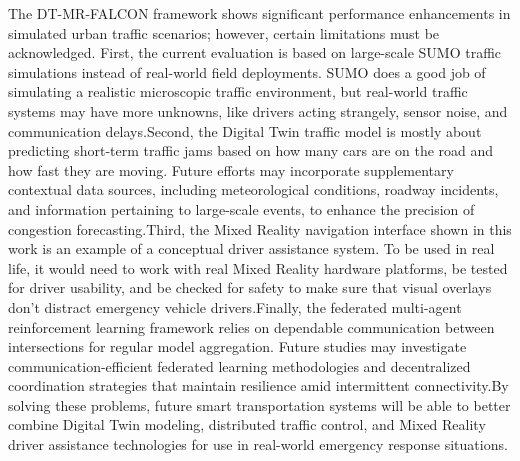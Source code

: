 \documentclass[conference]{IEEEtran}
\begin{document}
The DT-MR-FALCON framework shows significant performance enhancements in simulated urban traffic scenarios; however, certain limitations must be acknowledged. First, the current evaluation is based on large-scale SUMO traffic simulations instead of real-world field deployments. SUMO does a good job of simulating a realistic microscopic traffic environment, but real-world traffic systems may have more unknowns, like drivers acting strangely, sensor noise, and communication delays.Second, the Digital Twin traffic model is mostly about predicting short-term traffic jams based on how many cars are on the road and how fast they are moving. Future efforts may incorporate supplementary contextual data sources, including meteorological conditions, roadway incidents, and information pertaining to large-scale events, to enhance the precision of congestion forecasting.Third, the Mixed Reality navigation interface shown in this work is an example of a conceptual driver assistance system. To be used in real life, it would need to work with real Mixed Reality hardware platforms, be tested for driver usability, and be checked for safety to make sure that visual overlays don't distract emergency vehicle drivers.Finally, the federated multi-agent reinforcement learning framework relies on dependable communication between intersections for regular model aggregation. Future studies may investigate communication-efficient federated learning methodologies and decentralized coordination strategies that maintain resilience amid intermittent connectivity.By solving these problems, future smart transportation systems will be able to better combine Digital Twin modeling, distributed traffic control, and Mixed Reality driver assistance technologies for use in real-world emergency response situations.
\end{document}
